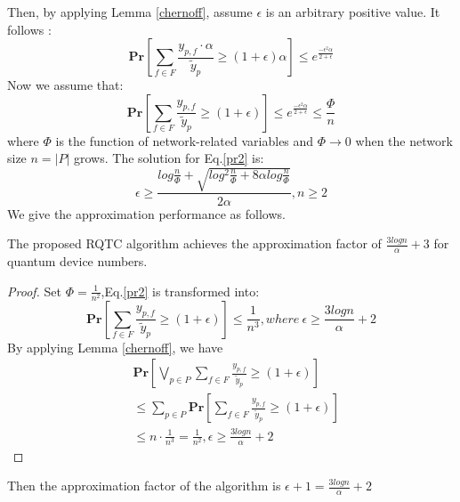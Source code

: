 Then, by applying Lemma \ref{chernoff}, assume $\epsilon$ is an arbitrary positive value. It follows :
\begin{equation}\label{pr1}
  \textbf{Pr}[\sum_{f \in F} \frac{y_{p,f} \cdot \alpha}{\widetilde{y}_p} \ge (1+\epsilon)\alpha] \le e^{\frac{-\epsilon^2\alpha}{2+\epsilon}}
\end{equation}
Now we assume that:
\begin{equation}\label{pr2}
  \textbf{Pr}[\sum_{f \in F} \frac{y_{p,f}}{\widetilde{y}_p} \ge (1+\epsilon)] \le e^{\frac{-\epsilon^2\alpha}{2+\epsilon}} \le \frac{\Phi}{n}
\end{equation}
where $\Phi$ is the function of network-related variables and $\Phi \rightarrow 0$ when the network size $n = |P|$ grows. The solution for Eq.\ref{pr2} is:
\begin{equation}\label{solution}
  \epsilon \ge \frac{log\frac{n}{\Phi}+\sqrt{log^2\frac{n}{\Phi}+8\alpha log\frac{n}{\Phi}}}{2\alpha},n \ge 2
\end{equation}
We give the approximation performance as follows.
\begin{theorem}
The proposed RQTC algorithm achieves the approximation factor of $\frac{3logn}{\alpha}+3$ for quantum device numbers.
\end{theorem}
\begin{proof}
Set $\Phi = \frac{1}{n^2}$,Eq.\ref{pr2} is transformed into:
\begin{equation}
    \textbf{Pr}[\sum_{f \in F} \frac{y_{p,f}}{\widetilde{y}_p} \ge (1+\epsilon)] \le \frac{1}{n^3},where \ \epsilon \ge \frac{3logn}{\alpha}+2
\end{equation}
By applying Lemma \ref{chernoff}, we have
\begin{equation}
\begin{aligned}
    &\textbf{Pr}[\bigvee_{p \in P}\sum_{f \in F} \frac{y_{p,f}}{\widetilde{y}_p} \ge (1+\epsilon)]\\ &\le \sum_{p \in P}\textbf{Pr}[\sum_{f \in F} \frac{y_{p,f}}{\widetilde{y}_p} \ge (1+\epsilon)]\\
    &\le n\cdot \frac{1}{n^3} = \frac{1}{n^2}, \epsilon \ge \frac{3logn}{\alpha}+2
\end{aligned}
\end{equation}
\end{proof}

Then the approximation factor of the algorithm is $\epsilon + 1 = \frac{3logn}{\alpha}+2$

